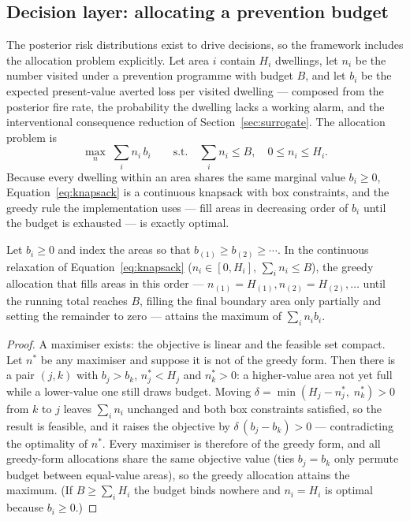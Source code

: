 \subsection{Decision layer: allocating a prevention budget}
\label{sec:model-decision}

The posterior risk distributions exist to drive decisions, so the framework
includes the allocation problem explicitly. Let area $i$ contain $H_i$ dwellings,
let $n_i$ be the number visited under a prevention programme with budget $B$, and
let $b_i$ be the expected present-value averted loss per visited dwelling ---
composed from the posterior fire rate, the probability the dwelling lacks a
working alarm, and the interventional consequence reduction of
Section~\ref{sec:surrogate}. The allocation problem is
\begin{equation}
  \max_{n}\; \sum_i n_i\, b_i
  \qquad \text{s.t.} \quad \sum_i n_i \le B,
  \quad 0 \le n_i \le H_i .
  \label{eq:knapsack}
\end{equation}
Because every dwelling within an area shares the same marginal value $b_i \ge 0$,
Equation~\eqref{eq:knapsack} is a continuous knapsack with box constraints, and
the greedy rule the implementation uses --- fill areas in decreasing order of
$b_i$ until the budget is exhausted --- is exactly optimal.

\begin{proposition}
\label{prop:greedy}
Let $b_i \ge 0$ and index the areas so that $b_{(1)} \ge b_{(2)} \ge \cdots$.
In the continuous relaxation of Equation~\eqref{eq:knapsack} ($n_i \in [0,H_i]$,
$\sum_i n_i \le B$), the greedy allocation that fills areas in this order ---
$n_{(1)} = H_{(1)}, n_{(2)} = H_{(2)}, \dots$ until the running total reaches $B$,
filling the final boundary area only partially and setting the remainder to
zero --- attains the maximum of $\sum_i n_i b_i$.
\end{proposition}

\begin{proof}
A maximiser exists: the objective is linear and the feasible set compact. Let
$n^\ast$ be any maximiser and suppose it is not of the greedy form. Then there is
a pair $(j,k)$ with $b_j > b_k$, $n^\ast_j < H_j$ and $n^\ast_k > 0$: a
higher-value area not yet full while a lower-value one still draws budget. Moving
$\delta = \min(H_j - n^\ast_j,\; n^\ast_k) > 0$ from $k$ to $j$ leaves
$\sum_i n_i$ unchanged and both box constraints satisfied, so the result is
feasible, and it raises the objective by $\delta\,(b_j - b_k) > 0$ ---
contradicting the optimality of $n^\ast$. Every maximiser is therefore of the
greedy form, and all greedy-form allocations share the same objective value
(ties $b_j = b_k$ only permute budget between equal-value areas), so the greedy
allocation attains the maximum. (If $B \ge \sum_i H_i$ the budget binds nowhere
and $n_i = H_i$ is optimal because $b_i \ge 0$.)
\end{proof}


